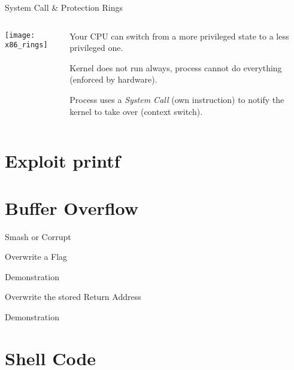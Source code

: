 \documentclass[beamer]{uibk}
\begin{document}
\begin{frame}{System Call \& Protection Rings}
    \begin{columns}
        \begin{column}{0.55\textwidth}
            \texttt{[image: x86\_rings]}
        \end{column}
        \begin{column}{0.45\textwidth}
            Your CPU can switch from a more privileged state to a less
            privileged one.

            \bigskip

            Kernel does not run always, process cannot do everything (enforced
            by hardware).

            \bigskip

            Process uses a \emph{System Call} (own instruction) to notify the
            kernel to take over (context switch).
        \end{column}
    \end{columns}
\end{frame}

\section{Exploit printf}

\section{Buffer Overflow}

\begin{frame}{Smash or Corrupt}

\end{frame}

\begin{frame}{Overwrite a Flag}
    \begin{center}
        \huge Demonstration
    \end{center}
\end{frame}

\begin{frame}{Overwrite the stored Return Address}
    \begin{center}
        \huge Demonstration
    \end{center}
\end{frame}

\section{Shell Code}
\end{document}
